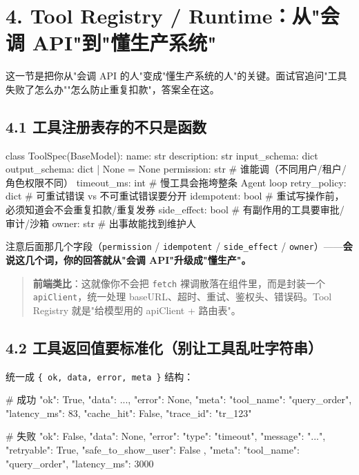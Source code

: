 \section{4. Tool Registry / Runtime：从"会调 API"到"懂生产系统"}

这一节是把你从"会调 API 的人"变成"懂生产系统的人"的关键。面试官追问"工具失败了怎么办""怎么防止重复扣款"，答案全在这。

\subsection{4.1 工具注册表存的不只是函数}

\begin{codeblock}
class ToolSpec(BaseModel):
    name: str
    description: str
    input_schema: dict
    output_schema: dict | None = None
    permission: str          # 谁能调（不同用户/租户/角色权限不同）
    timeout_ms: int          # 慢工具会拖垮整条 Agent loop
    retry_policy: dict        # 可重试错误 vs 不可重试错误要分开
    idempotent: bool          # 重试写操作前，必须知道会不会重复扣款/重复发券
    side_effect: bool         # 有副作用的工具要审批/审计/沙箱
    owner: str               # 出事故能找到维护人
\end{codeblock}

注意后面那几个字段（\texttt{permission} / \texttt{idempotent} / \texttt{side\_effect} / \texttt{owner}）——\textbf{会说这几个词，你的回答就从"会调 API"升级成"懂生产"。}

\begin{quote}
 \textbf{前端类比}：这就像你不会把 \texttt{fetch} 裸调散落在组件里，而是封装一个 \texttt{apiClient}，统一处理 baseURL、超时、重试、鉴权头、错误码。Tool Registry 就是"给模型用的 apiClient + 路由表"。
\end{quote}

\subsection{4.2 工具返回值要标准化（别让工具乱吐字符串）}

统一成 \texttt{\{ ok, data, error, meta \}} 结构：

\begin{codeblock}
# 成功
{ "ok": True,  "data": {...}, "error": None,
  "meta": { "tool_name": "query_order", "latency_ms": 83, "cache_hit": False, "trace_id": "tr_123" } }

# 失败
{ "ok": False, "data": None,
  "error": { "type": "timeout", "message": "...", "retryable": True, "safe_to_show_user": False },
  "meta": { "tool_name": "query_order", "latency_ms": 3000 } }
\end{codeblock}

